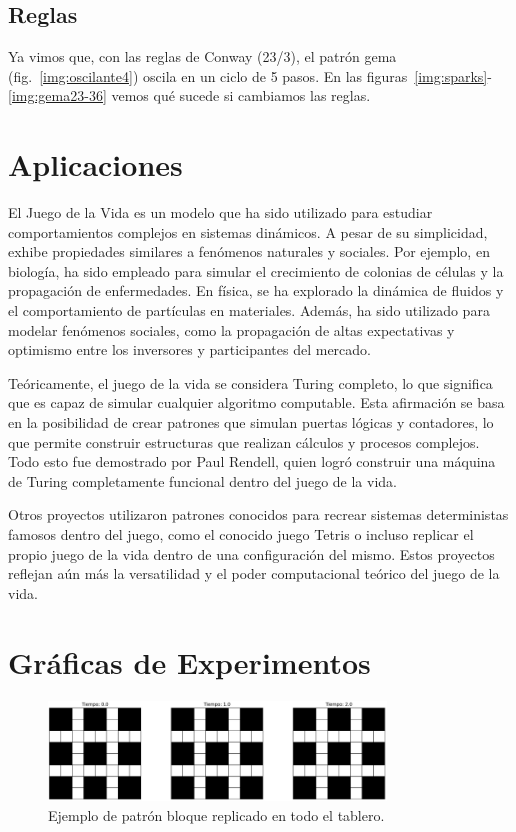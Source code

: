 \documentclass[12pt]{article}
\begin{document}
\subsection*{Reglas}

Ya vimos que, con las reglas de Conway (23/3), el patrón gema (fig.~\ref{img:oscilante4}) oscila en un ciclo de 5 pasos. En las figuras~\ref{img:sparks}-\ref{img:gema23-36} vemos qué sucede si cambiamos las reglas.


\section{Aplicaciones}

El Juego de la Vida es un modelo que ha sido utilizado para estudiar comportamientos complejos en sistemas dinámicos. A pesar de su simplicidad, exhibe propiedades similares a fenómenos naturales y sociales. Por ejemplo, en biología, ha sido empleado para simular el crecimiento de colonias de células y la propagación de enfermedades. En física, se ha explorado la dinámica de fluidos y el comportamiento de partículas en materiales. Además, ha sido utilizado para modelar fenómenos sociales, como la propagación de altas expectativas y optimismo entre los inversores y participantes del mercado.

Teóricamente, el juego de la vida se considera Turing completo, lo que significa que es capaz de simular cualquier algoritmo computable. Esta afirmación se basa en la posibilidad de crear patrones que simulan puertas lógicas y contadores, lo que permite construir estructuras que realizan cálculos y procesos complejos. Todo esto fue demostrado por Paul Rendell, quien logró construir una máquina de Turing completamente funcional dentro del juego de la vida.

Otros proyectos utilizaron patrones conocidos para recrear sistemas deterministas famosos dentro del juego, como el conocido juego Tetris o incluso replicar el propio juego de la vida dentro de una configuración del mismo. Estos proyectos reflejan aún más la versatilidad y el poder computacional teórico del juego de la vida.


\section{Gráficas de Experimentos}\label{sec:graficas}



\begin{figure}[h]
  \centering
  \includegraphics[width=0.8\textwidth]{imagenes/estatico1.png}
  \caption{Ejemplo de patrón bloque replicado en todo el tablero.\label{img:estatico1}}
\end{figure}
\end{document}
